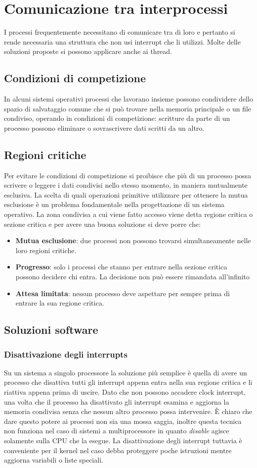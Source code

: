\section{Comunicazione tra interprocessi}
I processi frequentemente necessitano di comunicare tra di loro e pertanto si rende necessaria una struttura che non usi interrupt che li utilizzi. Molte delle soluzioni proposte si
possono applicare anche ai thread.
\subsection{Condizioni di competizione}
In alcuni sistemi operativi processi che lavorano insieme possono condividere dello spazio di salvataggio comune che si pu\`o trovare nella memoria principale o un file condiviso,
operando in condizioni di competizione: scritture da parte di un processo possono eliminare o sovrascrivere dati scritti da un altro.
\subsection{Regioni critiche}
Per evitare le condizioni di competizione si proibisce che più di un processo possa scrivere o leggere i dati condivisi nello stesso momento, in maniera mutualmente esclusiva. La scelta di
quali operazioni primitive utilizzare per ottenere la mutua esclusione è un problema fondamentale nella progettazione di un sistema operativo. La zona condivisa a cui viene fatto accesso viene detta regione critica o sezione
critica e per avere una buona soluzione si deve porre che:
\begin{itemize}
	\item \textbf{Mutua esclusione}: due processi non possono trovarsi simultaneamente nelle loro regioni critiche.
	\item \textbf{Progresso}: solo i processi che stanno per entrare nella sezione critica possono decidere chi entra.
	      La decisione non può essere rimandata all'infinito
	\item \textbf{Attesa limitata}: nessun processo deve aspettare per sempre prima di entrare la sua regione critica.
\end{itemize}
\subsection{Soluzioni software}
\subsubsection{Disattivazione degli interrupts}
Su un sistema a singolo processore la soluzione più semplice è quella di avere un processo che disattiva tutti gli interrupt appena entra nella sua regione critica e li riattiva appena
prima di uscire. Dato che non possono accadere clock interrupt, una volta che il processo ha disattivato gli interrupt esamina e aggiorna la memoria condivisa senza che nessun altro
processo possa intervenire. È chiaro che dare questo potere ai processi non sia una mossa saggia, inoltre questa tecnica non funziona nel caso di sistemi a multiprocessore in quanto
\emph{disable} agisce solamente sulla CPU che la esegue. La disattivazione degli interrupt tuttavia è conveniente per il kernel nel caso debba proteggere poche istruzioni mentre aggiorna variabili o liste speciali.
